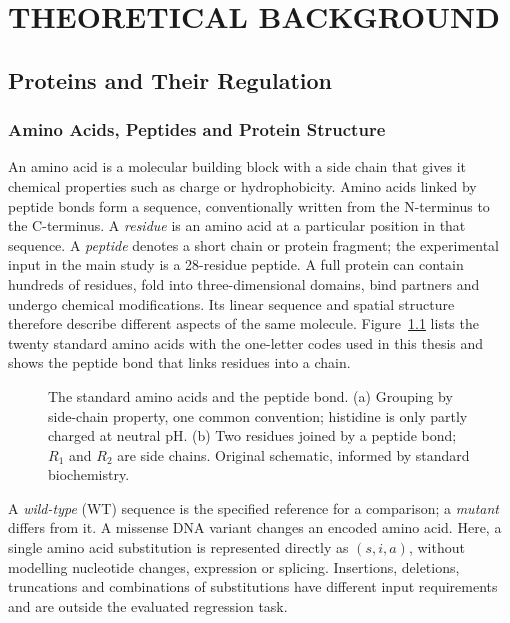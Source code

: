 \chapter{THEORETICAL BACKGROUND}\label{chap:background}

\section{Proteins and Their Regulation}
\subsection{Amino Acids, Peptides and Protein Structure}
An amino acid is a molecular building block with a side chain that gives it chemical properties such
as charge or hydrophobicity. Amino acids linked by peptide bonds form a sequence, conventionally
written from the N-terminus to the C-terminus. A \emph{residue} is an amino acid at a particular position
in that sequence. A \emph{peptide} denotes a short chain or protein fragment; the experimental input
in the main study is a 28-residue peptide. A full protein can contain hundreds of residues, fold into
three-dimensional domains, bind partners and undergo chemical modifications. Its linear sequence
and spatial structure therefore describe different aspects of the same molecule.
Figure~\ref{fig:amino-acids} lists the twenty standard amino acids with the one-letter codes used in
this thesis and shows the peptide bond that links residues into a chain.

\begin{figure}[htbp]
  \centering
  
  \caption[The standard amino acids and the peptide bond]{The standard amino acids and the peptide bond. (a) Grouping by side-chain property, one common convention; histidine is only partly charged at neutral pH. (b) Two residues joined by a peptide bond; $R_1$ and $R_2$ are side chains. Original schematic, informed by standard biochemistry.}
  \label{fig:amino-acids}
\end{figure}

A \emph{wild-type} (WT) sequence is the specified reference for a comparison; a \emph{mutant} differs
from it. A missense DNA variant changes an encoded amino acid. Here, a single amino acid
substitution is represented directly as $(s,i,a)$, without modelling nucleotide changes, expression or
splicing. Insertions, deletions, truncations and combinations of substitutions have different input
requirements and are outside the evaluated regression task.

